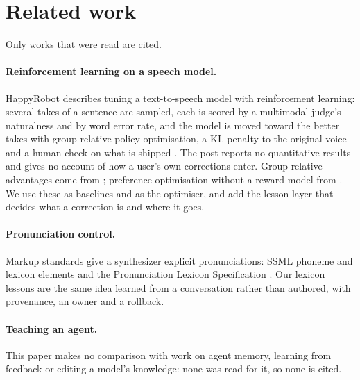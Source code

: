 
\section{Related work}\label{sec:related}

Only works that were read are cited.

\paragraph{Reinforcement learning on a speech model.}
HappyRobot describes tuning a text-to-speech model with reinforcement learning: several takes of
a sentence are sampled, each is scored by a multimodal judge's naturalness and by word error rate,
and the model is moved toward the better takes with group-relative policy optimisation, a KL penalty
to the original voice and a human check on what is shipped \citep{happyrobot2026tts}. The post
reports no quantitative results and gives no account of how a user's own corrections enter. Group-relative
advantages come from \citet{shao2024deepseekmath}; preference optimisation without a reward model
from \citet{rafailov2023dpo}. We use these as baselines and as the optimiser, and add the lesson layer
that decides what a correction is and where it goes.

\paragraph{Pronunciation control.}
Markup standards give a synthesizer explicit pronunciations: SSML phoneme and lexicon elements
\citep{w3c2010ssml} and the Pronunciation Lexicon Specification \citep{w3c2008pls}. Our lexicon lessons
are the same idea learned from a conversation rather than authored, with provenance, an owner and a
rollback.

\paragraph{Teaching an agent.}
This paper makes no comparison with work on agent memory, learning from feedback or editing a model's knowledge: none was read for it, so none is cited.
